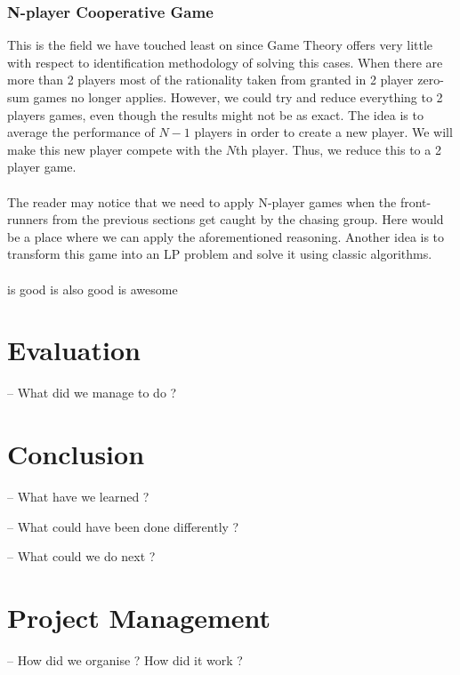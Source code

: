 \documentclass[10pt, a4paper]{report}
\begin{document}
\subsection{N-player Cooperative Game}
This is the field we have touched least on since Game Theory offers very little with respect to identification methodology of solving this cases. When there are more than 2 players most of the rationality taken from granted in 2 player zero-sum games no longer applies. However, we could try and reduce everything to 2 players games, even though the results might not be as exact. The idea is to average the performance of $N-1$ players in order to create a new player. We will make this new player compete with the $N$th player. Thus, we reduce this to a 2 player game.\\\\
The reader may notice that we need to apply N-player games when the front-runners from the previous sections get caught by the chasing group. Here would be a place where we can apply the aforementioned reasoning. Another idea is to transform this game into an LP problem and solve it using classic algorithms.
\\\\
\cite{GameTheoryNonTechnical} is good
\cite{GameTheoryApplications} is also good
\cite{TheoryOfGames} is awesome


\chapter{Evaluation}

-- What did we manage to do ?

\chapter{Conclusion}

-- What have we learned ?

-- What could have been done differently ?

-- What could we do next ?

\chapter{Project Management}

-- How did we organise ? How did it work ?





\end{document}
